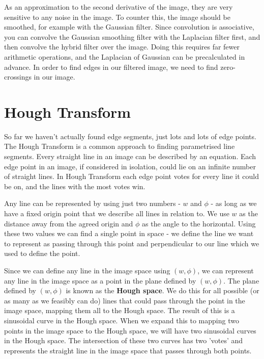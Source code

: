 \documentclass{article}
\begin{document}
	As an approximation to the second derivative of the image, they are very sensitive to any noise in the image. To counter this, the image should be smoothed, for example with the Gaussian filter. Since convolution is associative, you can convolve the Gaussian smoothing filter with the Laplacian filter first, and then convolve the hybrid filter over the image. Doing this requires far fewer arithmetic operations, and the Laplacian of Gaussian can be precalculated in advance. In order to find edges in our filtered image, we need to find zero-crossings in our image.
	
	\section{Hough Transform}
	So far we haven't actually found edge segments, just lots and lots of edge points. The Hough Transform is a common approach to finding parametrised line segments. Every straight line in an image can be described by an equation. Each edge point in an image, if considered in isolation, could lie on an infinite number of straight lines. In Hough Transform each edge point votes for every line it could be on, and the lines with the most votes win.
	
	\par
	Any line can be represented by using just two numbers - $w$ and $\phi$ - as long as we have a fixed origin point that we describe all lines in relation to. We use $w$ as the distance away from the agreed origin and $\phi$ as the angle to the horizontal. Using these two values we can find a single point in space - we define the line we want to represent as passing through this point and perpendicular to our line which we used to define the point. 
	
	\par 
	Since we can define any line in the image space using $(w, \phi)$, we can represent any line in the image space as a point in the plane defined by $(w, \phi)$. The plane defined by $(w, \phi)$ is known as the \textbf{Hough space}. We do this for all possible (or as many as we feasibly can do) lines that could pass through the point in the image space, mapping them all to the Hough space. The result of this is a sinusoidal curve in the Hough space. When we expand this to mapping two points in the image space to the Hough space, we will have two sinusoidal curves in the Hough space. The intersection of these two curves has two 'votes' and represents the straight line in the image space that passes through both points. 	
	
\end{document}
